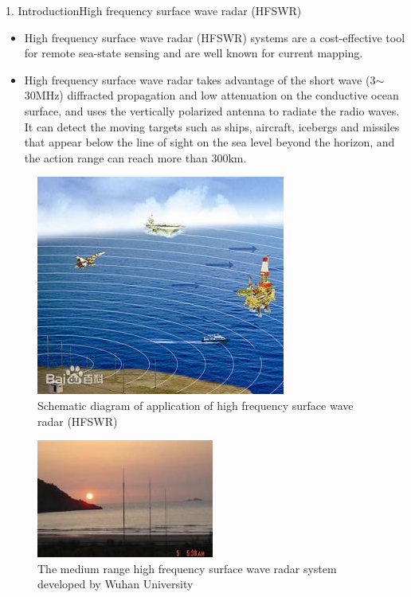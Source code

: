 \documentclass[12pt]{beamer}
\begin{document}
\begin{frame}{1. Introduction}{High frequency surface wave radar (HFSWR)}
  \begin{itemize}
    \item High frequency surface wave radar (HFSWR) systems are a cost-effective tool for remote sea-state sensing and are well known for current mapping.
    \item High frequency surface wave radar takes advantage of the short wave (3$\sim$30MHz) diffracted propagation and low attenuation on the conductive ocean surface, and uses the vertically polarized antenna to radiate the radio waves. It can detect the moving targets such as ships, aircraft, icebergs and missiles that appear below the line of sight on the sea level {\color{magenta} beyond the horizon}, and the action range can reach more than 300km.
  \end{itemize}
\end{frame}

\begin{frame} 
  \begin{figure}
    \centering
    \includegraphics[width=0.5\linewidth]{figs/f5.jpg}
    \caption{Schematic diagram of application of high frequency surface wave radar (HFSWR)}
  \end{figure}
\end{frame}
\begin{frame} 
  \begin{figure}
    \centering
    \includegraphics[width=0.7\linewidth]{figs/f6.jpg}
    \caption{The medium range high frequency surface wave radar system developed by Wuhan University}
  \end{figure}
\end{frame}
\end{document}
